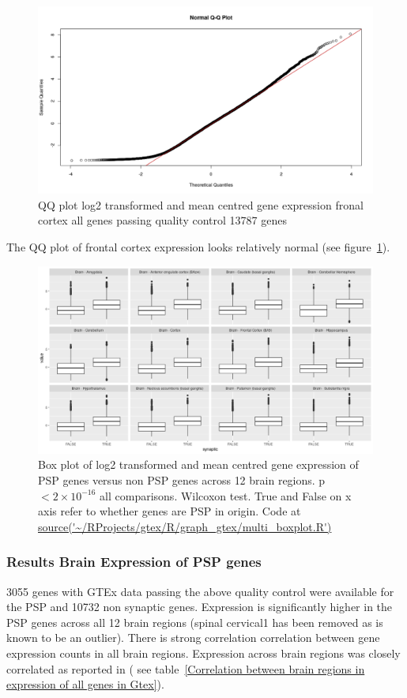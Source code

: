 \begin{figure}
    \centering
    \includegraphics[width=\textwidth]{images/Rplot_rough_qq.png}
    \caption{QQ plot log2 transformed and mean centred gene expression fronal cortex all genes passing quality control 13787 genes}
    \label{fig:qqplot frontal cortex}
\end{figure}

The QQ plot of frontal cortex expression looks relatively normal (see figure~\ref{fig:qqplot frontal cortex}).

\begin{figure}
    \centering
    \includegraphics[width=\textwidth]{images/Rplot_compare_expression2.png}
    \caption{Box plot of log2 transformed and mean centred gene expression of PSP genes versus non PSP genes across 12 brain regions. p $< 2 \times 10^{-16}$ all comparisons. Wilcoxon test. True and False on x axis refer to whether genes are PSP in origin. Code at \url{source('~/RProjects/gtex/R/graph_gtex/multi_boxplot.R')}}
    \label{fig:my_label}
\end{figure}

\subsubsection{Results Brain Expression of PSP genes}
\label{sec:gtex_results}
3055 genes with GTEx data passing the above quality control were available for the PSP and 10732 non synaptic genes. 
Expression is significantly higher in the PSP genes across all 12 brain regions (spinal cervical1 has been removed as is known to be an outlier). There is strong correlation correlation between gene expression counts in all brain regions. Expression across brain regions was closely correlated as reported in  \cite{gtex2015genotype}( 
see table~\ref{Correlation between brain regions in expression of all genes in Gtex}).

